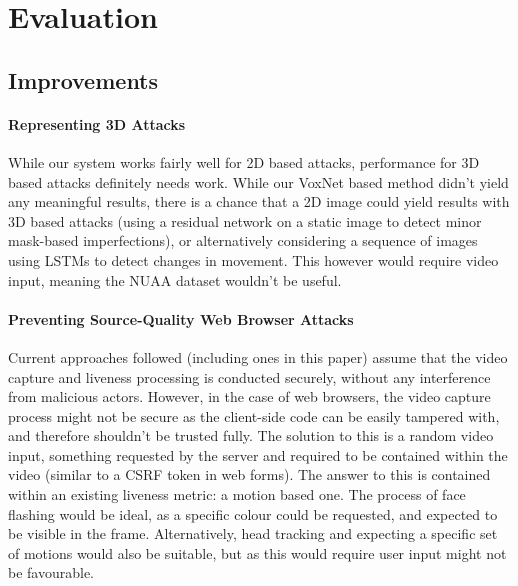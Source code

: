 \documentclass[10pt,a4paper]{article}
\begin{document}
\section{Evaluation}
    \subsection{Improvements}
    \paragraph{Representing 3D Attacks}
    While our system works fairly well for 2D based attacks, performance for 3D based attacks definitely needs work.
    While our VoxNet based method didn't yield any meaningful results, there is a chance that a 2D image could yield results
    with 3D based attacks (using a residual network on a static image to detect minor mask-based imperfections), or alternatively
    considering a sequence of images using LSTMs to detect changes in movement. This however would require video input, meaning the
    NUAA dataset wouldn't be useful.

    \paragraph{Preventing Source-Quality Web Browser Attacks}
    Current approaches followed (including ones in this paper) assume that the video capture and liveness processing is conducted securely, 
    without any interference from malicious actors. However, in the case of web browsers, the video capture process might not be secure as
    the client-side code can be easily tampered with, and therefore shouldn't be trusted fully. The solution to this is a random video input,
    something requested by the server and required to be contained within the video (similar to a CSRF token in web forms). The answer to this
    is contained within an existing liveness metric: a motion based one. The process of face flashing would be ideal, as a specific colour could
    be requested, and expected to be visible in the frame. Alternatively, head tracking and expecting a specific set of motions would also be suitable,
    but as this would require user input might not be favourable.

    
\end{document}
